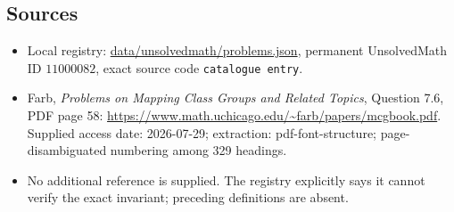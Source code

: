 \documentclass[11pt]{article}
\begin{document}
\subsection{Sources}
\begin{itemize}
\item Local registry: \url{data/unsolvedmath/problems.json}, permanent UnsolvedMath ID $11000082$, exact source code \texttt{catalogue entry}.
\item Farb, \emph{Problems on Mapping Class Groups and Related Topics}, Question 7.6, PDF page 58: \url{https://www.math.uchicago.edu/~farb/papers/mcgbook.pdf}. Supplied access date: 2026-07-29; extraction: pdf-font-structure; page-disambiguated numbering among 329 headings.
\item No additional reference is supplied. The registry explicitly says it cannot verify the exact invariant; preceding definitions are absent.
\end{itemize}
\end{document}
